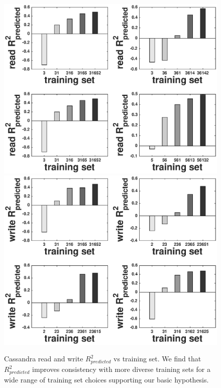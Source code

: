   \begin{figure}
    \centering
    \includegraphics[scale = 0.4]{cassandra_bar_read_avg_latency.eps}
    \includegraphics[scale = 0.4]{cassandra_bar_write_avg_latency.eps}
    \caption{Cassandra read and write $R^2_{predicted}$ vs training set. We find that $R^2_{predicted}$ improves consistency with more diverse training sets for a wide range of training set choices supporting our basic hypothesis.}
    \label{figure:cassandrabarread}
  \end{figure}

    
